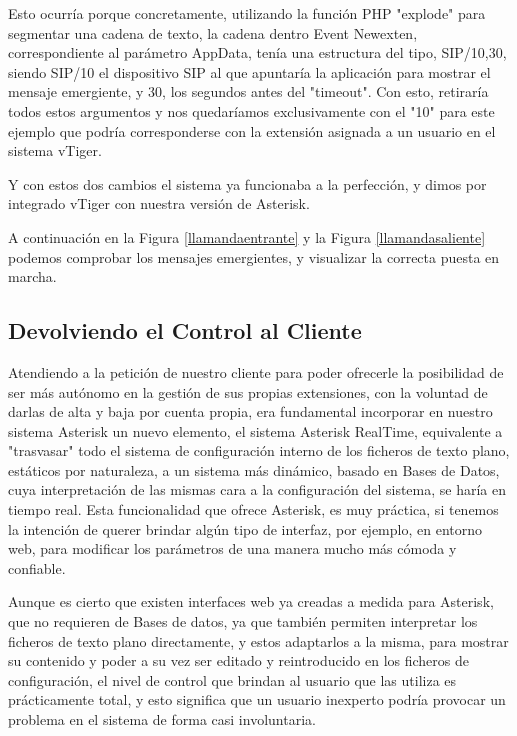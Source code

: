 Esto ocurría porque concretamente, utilizando la función PHP "explode" para segmentar una cadena de texto, la cadena dentro Event Newexten, correspondiente al parámetro AppData, tenía una estructura del tipo, SIP/10,30, siendo SIP/10 el dispositivo SIP al que apuntaría la aplicación para mostrar el mensaje emergiente, y 30, los segundos antes del "timeout". Con esto, retiraría todos estos argumentos y nos quedaríamos exclusivamente con el "10" para este ejemplo que podría corresponderse con la extensión asignada a un usuario en el sistema vTiger.

Y con estos dos cambios el sistema ya funcionaba a la perfección, y dimos por integrado vTiger con nuestra versión de Asterisk.

A continuación en la Figura \ref{llamandaentrante} y la Figura \ref{llamandasaliente} podemos comprobar los mensajes emergientes, y visualizar la correcta puesta en marcha.



\newpage

\subsection{Devolviendo el Control al Cliente}

Atendiendo a la petición de nuestro cliente para poder ofrecerle la posibilidad de ser más autónomo en la gestión de sus propias extensiones, con la voluntad de darlas de alta y baja por cuenta propia, era fundamental incorporar en nuestro sistema Asterisk un nuevo elemento, el sistema Asterisk RealTime, equivalente a "trasvasar" todo el sistema de configuración interno de los ficheros de texto plano, estáticos por naturaleza, a un sistema más dinámico, basado en Bases de Datos, cuya interpretación de las mismas cara a la configuración del sistema, se haría en tiempo real. Esta funcionalidad que ofrece Asterisk, es muy práctica, si tenemos la intención de querer brindar algún tipo de interfaz, por ejemplo, en entorno web, para modificar los parámetros de una manera mucho más cómoda y confiable.

Aunque es cierto que existen interfaces web ya creadas a medida para Asterisk, que no requieren de Bases de datos, ya que también permiten interpretar los ficheros de texto plano directamente, y estos adaptarlos a la misma, para mostrar su contenido y poder a su vez ser editado y reintroducido en los ficheros de configuración, el nivel de control que brindan al usuario que las utiliza es prácticamente total, y esto significa que un usuario inexperto podría provocar un problema en el sistema de forma casi involuntaria. 

